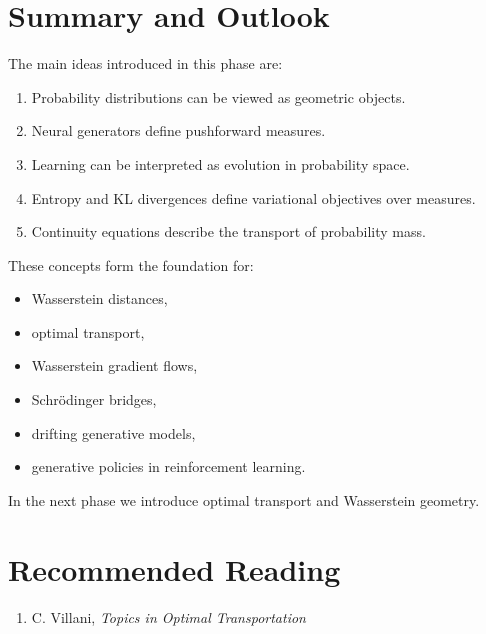 \section{Summary and Outlook}
The main ideas introduced in this phase are:
\begin{enumerate}[label=(\arabic*)]
    \item Probability distributions can be viewed as geometric objects.
    \item Neural generators define pushforward measures.
    \item Learning can be interpreted as evolution in probability space.
    \item Entropy and KL divergences define variational objectives over measures.
    \item Continuity equations describe the transport of probability mass.
\end{enumerate}
These concepts form the foundation for:
\begin{itemize}
    \item Wasserstein distances,
    \item optimal transport,
    \item Wasserstein gradient flows,
    \item Schr\"odinger bridges,
    \item drifting generative models,
    \item generative policies in reinforcement learning.
\end{itemize}
In the next phase we introduce optimal transport and Wasserstein geometry.
\section*{Recommended Reading}
\begin{enumerate}
    \item C. Villani, \emph{Topics in Optimal Transportation}
\end{enumerate}
